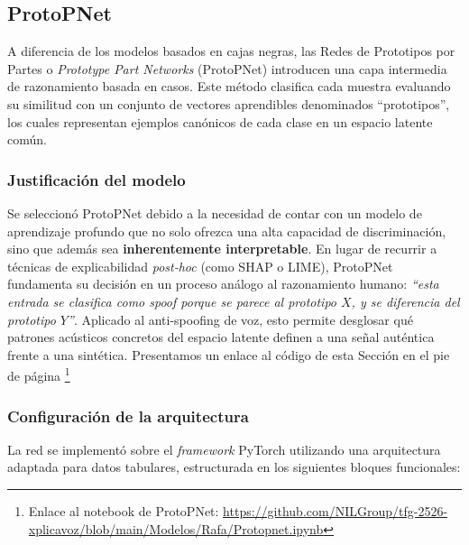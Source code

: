\subsection{ProtoPNet}
\label{subsubsec:mod_protopnet}

A diferencia de los modelos basados en cajas negras, las Redes de Prototipos por Partes o \textit{Prototype Part Networks} (ProtoPNet) introducen una capa intermedia de razonamiento basada en casos. Este método clasifica cada muestra evaluando su similitud con un conjunto de vectores aprendibles denominados ``prototipos'', los cuales representan ejemplos canónicos de cada clase en un espacio latente común.

\subsubsection*{Justificación del modelo}

Se seleccionó ProtoPNet debido a la necesidad de contar con un modelo de aprendizaje profundo que no solo ofrezca una alta capacidad de discriminación, sino que además sea \textbf{inherentemente interpretable}. En lugar de recurrir a técnicas de explicabilidad \textit{post-hoc} (como SHAP o LIME), ProtoPNet fundamenta su decisión en un proceso análogo al razonamiento humano: \textit{``esta entrada se clasifica como spoof porque se parece al prototipo $X$, y se diferencia del prototipo $Y$''}. Aplicado al anti-spoofing de voz, esto permite desglosar qué patrones acústicos concretos del espacio latente definen a una señal auténtica frente a una sintética. Presentamos un enlace al código de esta Sección en el pie de página \footnote{Enlace al notebook de ProtoPNet: \url{https://github.com/NILGroup/tfg-2526-xplicavoz/blob/main/Modelos/Rafa/Protopnet.ipynb}}

\subsubsection*{Configuración de la arquitectura}

La red se implementó sobre el \textit{framework} PyTorch utilizando una arquitectura adaptada para datos tabulares, estructurada en los siguientes bloques funcionales:

